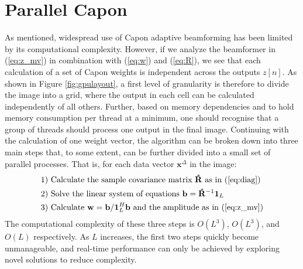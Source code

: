 \documentclass[journal]{IEEEtran}
\newcommand{\mat}[1]{\mathbf{#1}}
\renewcommand{\vec}[1]{\mathbf{#1}}
\begin{document}

\section{Parallel Capon}\label{sec:meth}
As mentioned, widespread use of Capon adaptive beamforming has been limited by its computational complexity. However, if we analyze the beamformer in (\ref{eq:z_mv}) in combination with (\ref{eq:w}) and (\ref{eq:R}), we see that each calculation of a set of Capon weights is independent across the outputs $z[n]$. As shown in Figure \ref{fig:gpulayout}, a first level of granularity is therefore to divide the image into a grid, where the output in each cell can be calculated independently of all others. Further, based on memory dependencies and to hold memory consumption per thread at a minimum, one should recognise that a group of threads should process one output in the final image. Continuing with the calculation of one weight vector, the algorithm can be broken down into three main steps that, to some extent, can be further divided into a small set of parallel processes. That is, for each data vector $\vec{x}^\Delta$ in the image:
\begin{align*}
\text{1) } &\text{Calculate the sample covariance matrix } \mat{\hat{R}} \text{ as in } \text{(\ref{eq:diag})}\\
\text{2) } &\text{Solve the linear system of equations } \vec{b} =\mat{\hat{R}}^{-1}\vec{1}_L\\
\text{3) } &\text{Calculate } \vec{w} = \vec{b}/\vec{1}_{L}^H\vec{b} \text{ and the amplitude as in (\ref{eq:z_mv})}
\end{align*}
The computational complexity of these three steps is $O(L^3)$, $O(L^3)$, and $O(L)$ respectively. As $L$ increases, the first two steps quickly become unmanageable, and real-time performance can only be achieved by exploring novel solutions to reduce complexity. 
\end{document}
